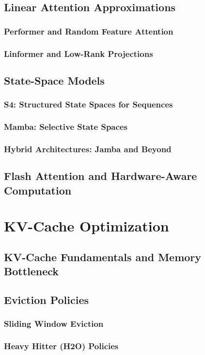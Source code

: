 \documentclass[12pt, letterpaper]{article}
\begin{document}
\subsection{Linear Attention Approximations}
\subsubsection{Performer and Random Feature Attention}
\subsubsection{Linformer and Low-Rank Projections}
\subsection{State-Space Models}
\subsubsection{S4: Structured State Spaces for Sequences}
\subsubsection{Mamba: Selective State Spaces}
\subsubsection{Hybrid Architectures: Jamba and Beyond}
\subsection{Flash Attention and Hardware-Aware Computation}

\section{KV-Cache Optimization}
\subsection{KV-Cache Fundamentals and Memory Bottleneck}
\subsection{Eviction Policies}
\subsubsection{Sliding Window Eviction}
\subsubsection{Heavy Hitter (H2O) Policies}
\end{document}
